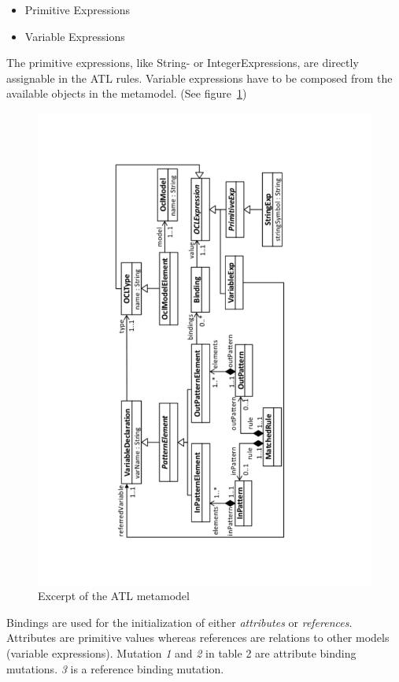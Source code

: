 \documentclass{llncs}
\begin{document}
\begin{itemize}
	\item Primitive Expressions
	\item Variable Expressions
\end{itemize}

The primitive expressions, like String- or IntegerExpressions, are directly assignable in the ATL rules. Variable expressions have to be composed from the available objects in the metamodel. (See figure~\ref{fig:atl_metamodel_excerpt})

\begin{figure}
	\centering
	\includegraphics[angle=270,width=1\textwidth,natwidth=610,natheight=642]{figures/ATL_Metamodel_Excerpt}
	\caption{Excerpt of the ATL metamodel}
	\label{fig:atl_metamodel_excerpt}
\end{figure}

Bindings are used for the initialization of either \emph{attributes} or \emph{references}. Attributes are primitive values whereas references are relations to other models (variable expressions). Mutation \emph{1} and \emph{2} in table 2 are attribute binding mutations. \emph{3} is a reference binding mutation.
\end{document}
